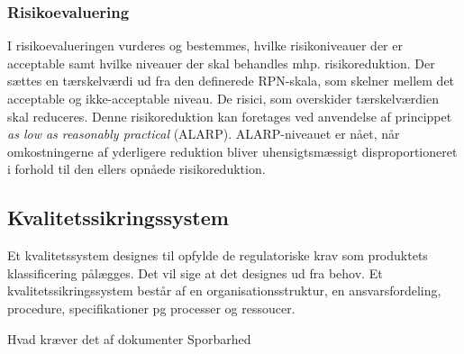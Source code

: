 	\subsubsection{Risikoevaluering}  
	I risikoevalueringen vurderes og bestemmes, hvilke risikoniveauer der er acceptable samt hvilke niveauer der skal behandles mhp. risikoreduktion. Der sættes en tærskelværdi ud fra den definerede RPN-skala, som skelner mellem det acceptable og ikke-acceptable niveau. De risici, som overskider tærskelværdien skal reduceres. Denne risikoreduktion kan foretages ved anvendelse af princippet \textit{as low as reasonably practical}{} (ALARP). ALARP-niveauet er nået, når omkostningerne af yderligere reduktion bliver uhensigtsmæssigt disproportioneret i forhold til den ellers opnåede risikoreduktion.    

\subsection{Kvalitetssikringssystem}

Et kvalitetssystem designes til opfylde de regulatoriske krav som produktets klassificering pålægges. Det vil sige at det designes ud fra behov. 
Et kvalitetssikringssystem består af en organisationsstruktur, en ansvarsfordeling, procedure, specifikationer pg processer og ressoucer. 

Hvad kræver det af dokumenter
Sporbarhed


